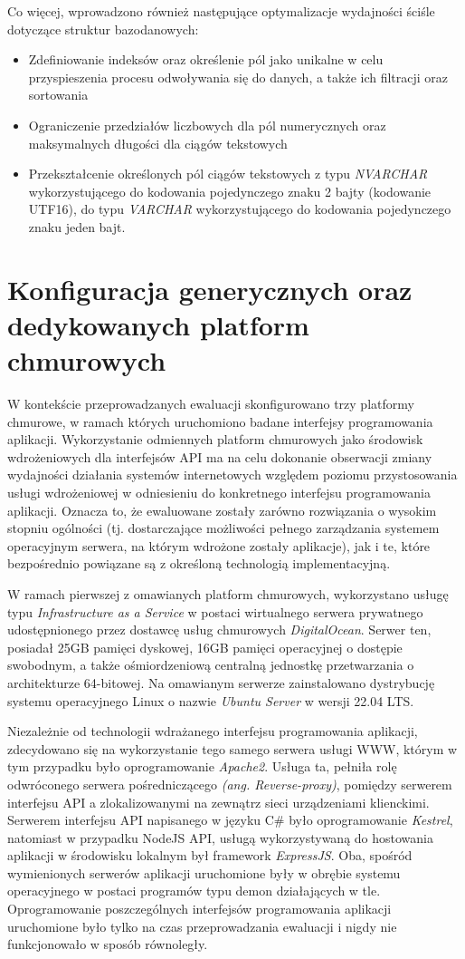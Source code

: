 Co więcej, wprowadzono również następujące optymalizacje wydajności ściśle dotyczące struktur bazodanowych:
\begin{itemize}
    \item Zdefiniowanie indeksów oraz określenie pól jako unikalne w celu przyspieszenia procesu odwoływania się do danych, a także ich filtracji oraz sortowania
    \item Ograniczenie przedziałów liczbowych dla pól numerycznych oraz maksymalnych długości dla ciągów tekstowych
    \item Przekształcenie określonych pól ciągów tekstowych z typu \textit{NVARCHAR} wykorzystującego do kodowania pojedynczego znaku 2 bajty (kodowanie UTF16), do typu \textit{VARCHAR} wykorzystującego do kodowania pojedynczego znaku jeden bajt.
\end{itemize}
\section{Konfiguracja generycznych oraz dedykowanych platform chmurowych}
W kontekście przeprowadzanych ewaluacji skonfigurowano trzy platformy chmurowe, w ramach których uruchomiono badane interfejsy programowania aplikacji. Wykorzystanie odmiennych platform chmurowych jako środowisk wdrożeniowych dla interfejsów API ma na celu dokonanie obserwacji zmiany wydajności działania systemów internetowych względem poziomu przystosowania usługi wdrożeniowej w odniesieniu do konkretnego interfejsu programowania aplikacji. Oznacza to, że ewaluowane zostały zarówno rozwiązania o wysokim stopniu ogólności (tj. dostarczające możliwości pełnego zarządzania systemem operacyjnym serwera, na którym wdrożone zostały aplikacje), jak i te, które bezpośrednio powiązane są z określoną technologią implementacyjną.

W ramach pierwszej z omawianych platform chmurowych, wykorzystano usługę typu \textit{Infrastructure as a Service} w postaci wirtualnego serwera prywatnego udostępnionego przez dostawcę usług chmurowych \textit{DigitalOcean}. Serwer ten, posiadał 25GB pamięci dyskowej, 16GB pamięci operacyjnej o dostępie swobodnym, a także ośmiordzeniową centralną jednostkę przetwarzania o architekturze 64-bitowej. Na omawianym serwerze zainstalowano dystrybucję systemu operacyjnego Linux o nazwie \textit{Ubuntu Server} w wersji 22.04 LTS.

Niezależnie od technologii wdrażanego interfejsu programowania aplikacji, zdecydowano się na wykorzystanie tego samego serwera usługi WWW, którym w tym przypadku było oprogramowanie \textit{Apache2}. Usługa ta, pełniła rolę odwróconego serwera pośredniczącego \textit{(ang. Reverse-proxy)}, pomiędzy serwerem interfejsu API a zlokalizowanymi na zewnątrz sieci urządzeniami klienckimi. Serwerem interfejsu API napisanego w języku C\# było oprogramowanie \textit{Kestrel}, natomiast w przypadku NodeJS API, usługą wykorzystywaną do hostowania aplikacji w środowisku lokalnym był framework \textit{ExpressJS}. Oba, spośród wymienionych serwerów aplikacji uruchomione były w obrębie systemu operacyjnego w postaci programów typu demon działających w tle. Oprogramowanie poszczególnych interfejsów programowania aplikacji uruchomione było tylko na czas przeprowadzania ewaluacji i nigdy nie funkcjonowało w sposób równoległy.

